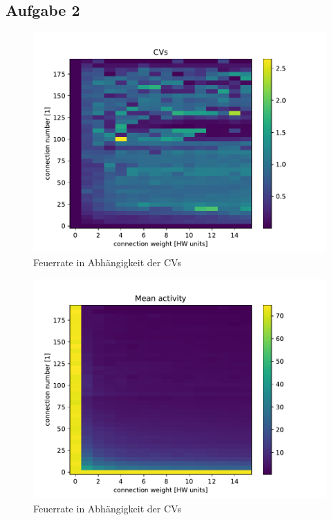 \documentclass[10pt,a4paper]{scrartcl}
\begin{document}
\subsection{Aufgabe 2}

\begin{figure} [ht]
\begin{center}
\label{fig:abb4}
\caption{Feuerrate in Abhängigkeit der CVs}
\includegraphics[scale=0.45]{pictures/CVs.pdf}
\end{center}
\end{figure}

\begin{figure} [ht]
\begin{center}
\label{fig:abb4}
\caption{Feuerrate in Abhängigkeit der CVs}
\includegraphics[scale=0.45]{pictures/mean_activity.pdf}
\end{center}
\end{figure}
\end{document}
